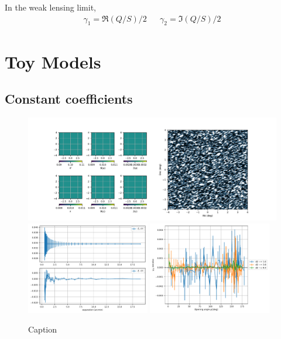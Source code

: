 In the weak lensing limit, 
\begin{align}
\gamma_1 = \Re(Q / S) \Big/ 2 && \gamma_2 = \Im(Q / S) \Big/ 2
\end{align}

\section{Toy Models} \label{sec:toy_models}

\subsection{Constant coefficients}

\begin{figure}[h]
\centering
\includegraphics[width=\textwidth]{figs/20230109_constant/coeff_shear.pdf}
\includegraphics[width=0.48\textwidth]{figs/20230109_constant/2point.pdf}
\includegraphics[width=0.48\textwidth]{figs/20230109_constant/3point.pdf}
\caption{Caption}
\label{fig:constant}
\end{figure}

